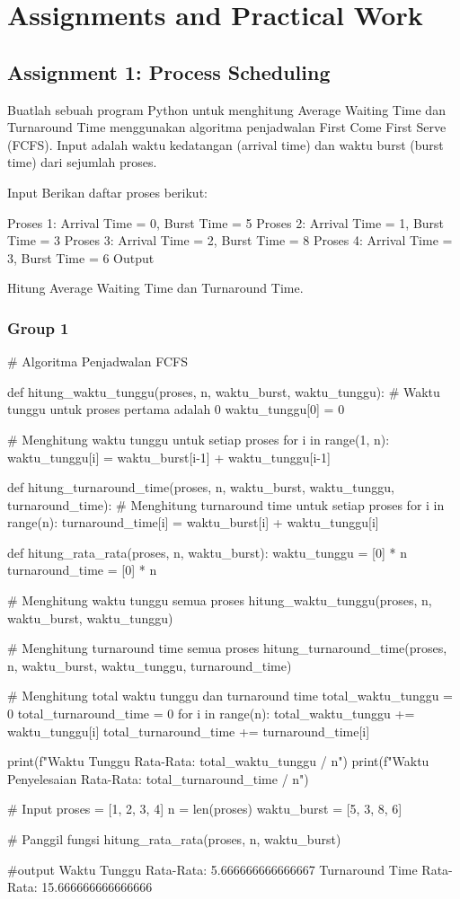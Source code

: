 \documentclass[12pt]{article}
\begin{document}
\section{Assignments and Practical Work}
\subsection{Assignment 1: Process Scheduling}
Buatlah sebuah program Python untuk menghitung Average Waiting Time dan Turnaround Time menggunakan algoritma penjadwalan First Come First Serve (FCFS). Input adalah waktu kedatangan (arrival time) dan waktu burst (burst time) dari sejumlah proses.

Input
Berikan daftar proses berikut:

Proses 1: Arrival Time = 0, Burst Time = 5
Proses 2: Arrival Time = 1, Burst Time = 3
Proses 3: Arrival Time = 2, Burst Time = 8
Proses 4: Arrival Time = 3, Burst Time = 6
Output

Hitung Average Waiting Time dan Turnaround Time.

\subsubsection{Group 1}
\begin{python}
# Algoritma Penjadwalan FCFS

def hitung_waktu_tunggu(proses, n, waktu_burst, waktu_tunggu):
    # Waktu tunggu untuk proses pertama adalah 0
    waktu_tunggu[0] = 0

    # Menghitung waktu tunggu untuk setiap proses
    for i in range(1, n):
        waktu_tunggu[i] = waktu_burst[i-1] + waktu_tunggu[i-1]

def hitung_turnaround_time(proses, n, waktu_burst, waktu_tunggu, turnaround_time):
    # Menghitung turnaround time untuk setiap proses
    for i in range(n):
        turnaround_time[i] = waktu_burst[i] + waktu_tunggu[i]

def hitung_rata_rata(proses, n, waktu_burst):
    waktu_tunggu = [0] * n
    turnaround_time = [0] * n

    # Menghitung waktu tunggu semua proses
    hitung_waktu_tunggu(proses, n, waktu_burst, waktu_tunggu)

    # Menghitung turnaround time semua proses
    hitung_turnaround_time(proses, n, waktu_burst, waktu_tunggu, turnaround_time)

    # Menghitung total waktu tunggu dan turnaround time
    total_waktu_tunggu = 0
    total_turnaround_time = 0
    for i in range(n):
        total_waktu_tunggu += waktu_tunggu[i]
        total_turnaround_time += turnaround_time[i]

    print(f"Waktu Tunggu Rata-Rata: {total_waktu_tunggu / n}")
    print(f"Waktu Penyelesaian Rata-Rata: {total_turnaround_time / n}")

# Input
proses = [1, 2, 3, 4]
n = len(proses)
waktu_burst = [5, 3, 8, 6]

# Panggil fungsi
hitung_rata_rata(proses, n, waktu_burst)

#output
Waktu Tunggu Rata-Rata: 5.666666666666667
Turnaround Time Rata-Rata: 15.666666666666666
   
\end{python}
\end{document}
